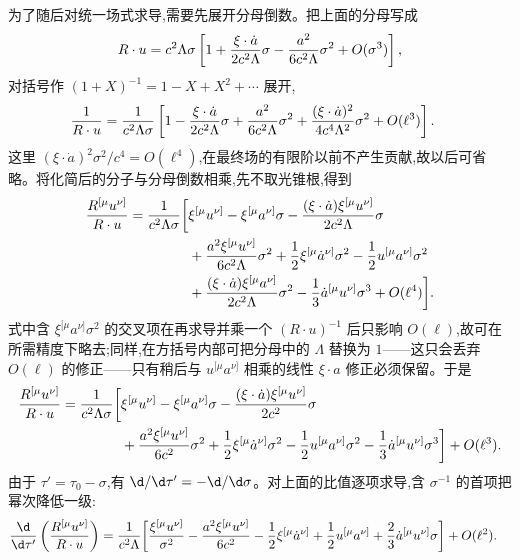 为了随后对统一场式求导,需要先展开分母倒数。把上面的分母写成
\begin{equation*}
 R\cdot u=c^2\Lambda\sigma
 \left[1+{\xi\cdot\dot a\over2c^2\Lambda}\sigma
 -{a^2\over6c^2\Lambda}\sigma^2
 +O(\sigma^3)\right],
\end{equation*}
对括号作 $(1+X)^{-1}=1-X+X^2+\cdots$ 展开,
\begin{align*}
 {1\over R\cdot u}
 &={1\over c^2\Lambda\sigma}
 \left[
 1-{\xi\cdot\dot a\over2c^2\Lambda}\sigma
 +{a^2\over6c^2\Lambda}\sigma^2
 +{(\xi\cdot\dot a)^2\over4c^4\Lambda^2}\sigma^2
 +O(\ell^3)
 \right].
\end{align*}
这里 $(\xi\cdot\dot a)^2\sigma^2/c^4=O(\ell^4)$,在最终场的有限阶以前不产生贡献,故以后可省略。将化简后的分子与分母倒数相乘,先不取光锥根,得到
\begin{align*}
 {R^{[\mu}u^{\nu]}\over R\cdot u}
 ={1\over c^2\Lambda\sigma}\bigg[{}&
 \xi^{[\mu}u^{\nu]}
 -\xi^{[\mu}a^{\nu]}\sigma
 -{(\xi\cdot\dot a)\xi^{[\mu}u^{\nu]}\over2c^2\Lambda}\sigma\\
 &+{a^2\xi^{[\mu}u^{\nu]}\over6c^2\Lambda}\sigma^2
 +{1\over2}\xi^{[\mu}\dot a^{\nu]}\sigma^2
 -{1\over2}u^{[\mu}a^{\nu]}\sigma^2\\
 &+{(\xi\cdot\dot a)\xi^{[\mu}a^{\nu]}\over2c^2\Lambda}\sigma^2
 -{1\over3}\dot a^{[\mu}u^{\nu]}\sigma^3
 +O(\ell^4)
 \bigg].
\end{align*}
式中含 $\xi^{[\mu}a^{\nu]}\sigma^2$ 的交叉项在再求导并乘一个 $(R\cdot u)^{-1}$ 后只影响 $O(\ell)$,故可在所需精度下略去;同样,在方括号内部可把分母中的 $\Lambda$ 替换为 $1$——这只会丢弃 $O(\ell)$ 的修正——只有稍后与 $u^{[\mu}a^{\nu]}$ 相乘的线性 $\xi\cdot a$ 修正必须保留。于是
\begin{align*}
 {R^{[\mu}u^{\nu]}\over R\cdot u}
 ={1\over c^2\Lambda\sigma}\bigg[{}&
 \xi^{[\mu}u^{\nu]}
 -\xi^{[\mu}a^{\nu]}\sigma
 -{(\xi\cdot\dot a)\xi^{[\mu}u^{\nu]}\over2c^2}\sigma\\
 &+{a^2\xi^{[\mu}u^{\nu]}\over6c^2}\sigma^2
 +{1\over2}\xi^{[\mu}\dot a^{\nu]}\sigma^2
 -{1\over2}u^{[\mu}a^{\nu]}\sigma^2
 -{1\over3}\dot a^{[\mu}u^{\nu]}\sigma^3
 \bigg]+O(\ell^3).
\end{align*}
由于 $\tau'=\tau_0-\sigma$,有 $\d/\d\tau'=-\d/\d\sigma$。对上面的比值逐项求导,含 $\sigma^{-1}$ 的首项把幂次降低一级:
\begin{align*}
 {\d\over\d\tau'}
 \left({R^{[\mu}u^{\nu]}\over R\cdot u}\right)
 ={1\over c^2\Lambda}\bigg[{}&
 {\xi^{[\mu}u^{\nu]}\over\sigma^2}
 -{a^2\xi^{[\mu}u^{\nu]}\over6c^2}
 -{1\over2}\xi^{[\mu}\dot a^{\nu]}
 +{1\over2}u^{[\mu}a^{\nu]}
 +{2\over3}\dot a^{[\mu}u^{\nu]}\sigma
 \bigg]+O(\ell^2).
\end{align*}
